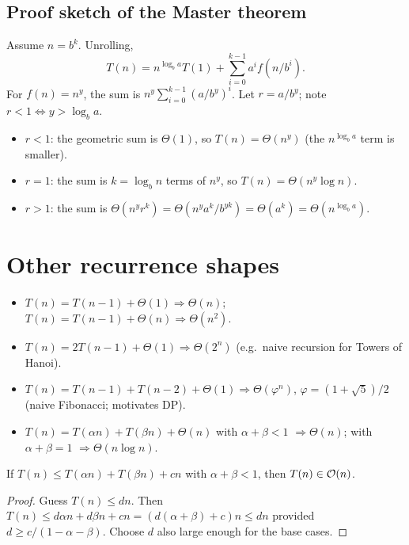\subsection{Proof sketch of the Master theorem}
Assume $n=b^k$. Unrolling,
\[
T(n)=n^{\log_b a}T(1)+\sum_{i=0}^{k-1}a^if(n/b^i).
\]
For $f(n)=n^y$, the sum is $n^y\sum_{i=0}^{k-1}(a/b^y)^i$. Let $r=a/b^y$; note $r<1\iff y>\log_b a$.
\begin{itemize}
  \item $r<1$: the geometric sum is $\Theta(1)$, so $T(n)=\Theta(n^y)$ (the $n^{\log_b a}$ term is smaller).
  \item $r=1$: the sum is $k=\log_b n$ terms of $n^y$, so $T(n)=\Theta(n^y\log n)$.
  \item $r>1$: the sum is $\Theta(n^y r^k)=\Theta(n^y a^k/b^{yk})=\Theta(a^k)=\Theta(n^{\log_b a})$.
\end{itemize}

\section{Other recurrence shapes}
\begin{itemize}
  \item $T(n)=T(n-1)+\Theta(1)\Rightarrow\Theta(n)$; $T(n)=T(n-1)+\Theta(n)\Rightarrow\Theta(n^2)$.
  \item $T(n)=2T(n-1)+\Theta(1)\Rightarrow\Theta(2^n)$ (e.g.\ naive recursion for Towers of Hanoi).
  \item $T(n)=T(n-1)+T(n-2)+\Theta(1)\Rightarrow\Theta(\varphi^n)$, $\varphi=(1+\sqrt5)/2$ (naive Fibonacci; motivates DP).
  \item $T(n)=T(\alpha n)+T(\beta n)+\Theta(n)$ with $\alpha+\beta<1$ $\Rightarrow\Theta(n)$; with $\alpha+\beta=1$ $\Rightarrow\Theta(n\log n)$.
\end{itemize}

\begin{theorem}
If $T(n)\le T(\alpha n)+T(\beta n)+cn$ with $\alpha+\beta<1$, then $T(n)\in\mathcal{O}(n)$.
\end{theorem}
\begin{proof}
Guess $T(n)\le dn$. Then $T(n)\le d\alpha n+d\beta n+cn=(d(\alpha+\beta)+c)n\le dn$ provided
$d\ge c/(1-\alpha-\beta)$. Choose $d$ also large enough for the base cases.
\end{proof}

